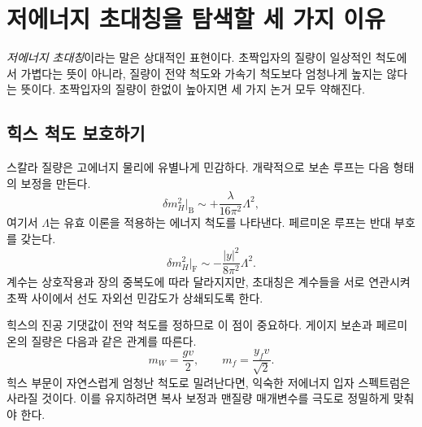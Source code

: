 \section{저에너지 초대칭을 탐색할 세 가지 이유}

\begin{classroomqa}
\end{classroomqa}

\emph{저에너지 초대칭}이라는 말은 상대적인 표현이다. 초짝입자의 질량이 일상적인 척도에서 가볍다는 뜻이 아니라, 질량이 전약 척도와 가속기 척도보다 엄청나게 높지는 않다는 뜻이다. 초짝입자의 질량이 한없이 높아지면 세 가지 논거 모두 약해진다.

\subsection{힉스 척도 보호하기}

스칼라 질량은 고에너지 물리에 유별나게 민감하다. 개략적으로 보손 루프는 다음 형태의 보정을 만든다.
\begin{equation}
\delta m_H^2\big|_{\mathrm B}
\sim +\frac{\lambda}{16\pi^2}\Lambda^2,
\end{equation}
여기서 \(\Lambda\)는 유효 이론을 적용하는 에너지 척도를 나타낸다. 페르미온 루프는 반대 부호를 갖는다.
\begin{equation}
\delta m_H^2\big|_{\mathrm F}
\sim -\frac{|y|^2}{8\pi^2}\Lambda^2.
\end{equation}
계수는 상호작용과 장의 중복도에 따라 달라지지만, 초대칭은 계수들을 서로 연관시켜 초짝 사이에서 선도 자외선 민감도가 상쇄되도록 한다.

힉스의 진공 기댓값이 전약 척도를 정하므로 이 점이 중요하다. 게이지 보손과 페르미온의 질량은 다음과 같은 관계를 따른다.
\begin{equation}
m_W=\frac{gv}{2},
\qquad
m_f=\frac{y_fv}{\sqrt2}.
\end{equation}
힉스 부문이 자연스럽게 엄청난 척도로 밀려난다면, 익숙한 저에너지 입자 스펙트럼은 사라질 것이다. 이를 유지하려면 복사 보정과 맨질량 매개변수를 극도로 정밀하게 맞춰야 한다.

